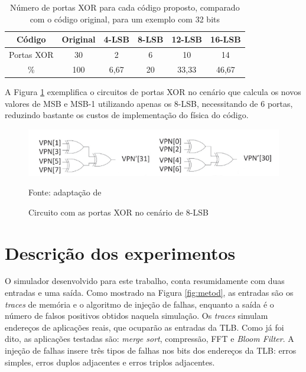 \begin{table}[ht]
\centering
\caption{Número de portas XOR para cada código proposto, comparado com o código original, para um exemplo com 32 bits}
\begin{tabular}{c|c|c|c|c|c}
\hline
\rowcolor[HTML]{EFEFEF} 
\textbf{Código }                            & \textbf{Original} & \textbf{4-LSB} & \textbf{8-LSB} &\textbf{ 12-LSB} & \textbf{16-LSB} \\ \hline
\cellcolor[HTML]{EFEFEF}Portas XOR & 30       & 2     & 6     & 10     & 14     \\ \hline
\cellcolor[HTML]{EFEFEF}\%         & 100      & 6,67  & 20    & 33,33  & 46,67  \\ \hline
\end{tabular}
\end{table}

A Figura \ref{fig:8lsb} exemplifica o circuitos de portas XOR no cenário que calcula os novos valores de MSB e MSB-1 utilizando apenas os 8-LSB, necessitando de 6 portas, reduzindo bastante os custos de implementação do física do código.

\begin{figure}[ht]
    \centering
    \includegraphics[scale=0.8]{figuras/8lsb.png}
    \caption{Circuito com as portas XOR no cenário de 8-LSB}{Fonte: adaptação de \cite{sanchez2019reducing}}
    \label{fig:8lsb}
\end{figure}

\section{Descrição dos experimentos}

O simulador desenvolvido para este trabalho, conta resumidamente com duas entradas e uma saída. Como mostrado na Figura \ref{fig:metod}, as entradas são os \textit{traces} de memória e o algoritmo de injeção de falhas, enquanto a saída é o número de falsos positivos obtidos naquela simulação. Os \textit{traces} simulam endereços de aplicações reais, que ocuparão as entradas da TLB. Como já foi dito, as aplicações testadas são: \textit{merge sort}, compressão, FFT e \textit{Bloom Filter}. A injeção de falhas insere três tipos de falhas nos bits dos endereços da TLB: erros simples, erros duplos adjacentes e erros triplos adjacentes.

